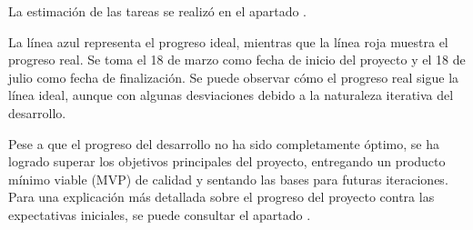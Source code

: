 La estimación de las tareas se realizó en el apartado .

\newpage{}
La línea azul representa el progreso ideal, mientras que la línea roja muestra
el progreso real. Se toma el 18 de marzo como fecha de inicio del proyecto y el
18 de julio como fecha de finalización. Se puede observar cómo el progreso real
sigue la línea ideal, aunque con algunas desviaciones debido a la naturaleza
iterativa del desarrollo.

Pese a que el progreso del desarrollo no ha sido completamente óptimo, se ha
logrado superar los objetivos principales del proyecto, entregando un producto
mínimo viable (MVP) de calidad y sentando las bases para futuras iteraciones.
Para una explicación más detallada sobre el progreso del proyecto contra las
expectativas iniciales, se puede consultar el apartado .

\newpage{}


\newpage{}


\newpage{}


\newpage{}

